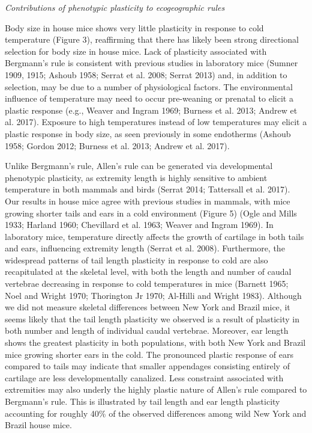 \documentclass[
]{article}
\begin{document}
\vspace{3.5mm}

\noindent\emph{Contributions of phenotypic plasticity to ecogeographic
rules}

Body size in house mice shows very little plasticity in response to cold
temperature (Figure 3), reaffirming that there has likely been strong
directional selection for body size in house mice. Lack of plasticity
associated with Bergmann's rule is consistent with previous studies in
laboratory mice (Sumner 1909, 1915; Ashoub 1958; Serrat et al. 2008;
Serrat 2013) and, in addition to selection, may be due to a number of
physiological factors. The environmental influence of temperature may
need to occur pre-weaning or prenatal to elicit a plastic response
(e.g., Weaver and Ingram 1969; Burness et al. 2013; Andrew et al. 2017).
Exposure to high temperatures instead of low temperatures may elicit a
plastic response in body size, as seen previously in some endotherms
(Ashoub 1958; Gordon 2012; Burness et al. 2013; Andrew et al. 2017).

Unlike Bergmann's rule, Allen's rule can be generated via developmental
phenotypic plasticity, as extremity length is highly sensitive to
ambient temperature in both mammals and birds (Serrat 2014; Tattersall
et al. 2017). Our results in house mice agree with previous studies in
mammals, with mice growing shorter tails and ears in a cold environment
(Figure 5) (Ogle and Mills 1933; Harland 1960; Chevillard et al. 1963;
Weaver and Ingram 1969). In laboratory mice, temperature directly
affects the growth of cartilage in both tails and ears, influencing
extremity length (Serrat et al. 2008). Furthermore, the widespread
patterns of tail length plasticity in response to cold are also
recapitulated at the skeletal level, with both the length and number of
caudal vertebrae decreasing in response to cold temperatures in mice
(Barnett 1965; Noel and Wright 1970; Thorington Jr 1970; Al-Hilli and
Wright 1983). Although we did not measure skeletal differences between
New York and Brazil mice, it seems likely that the tail length
plasticity we observed is a result of plasticity in both number and
length of individual caudal vertebrae. Moreover, ear length shows the
greatest plasticity in both populations, with both New York and Brazil
mice growing shorter ears in the cold. The pronounced plastic response
of ears compared to tails may indicate that smaller appendages
consisting entirely of cartilage are less developmentally canalized.
Less constraint associated with extremities may also underly the highly
plastic nature of Allen's rule compared to Bergmann's rule. This is
illustrated by tail length and ear length plasticity accounting for
roughly 40\% of the observed differences among wild New York and Brazil
house mice.
\end{document}
